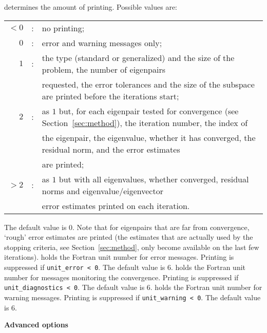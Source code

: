 \begin{description}
%
determines the amount of printing.
Possible values are:\\
%
\begin{tabular}{rcl}
$<0$ &:& no printing;\\
$0$ &:& error and warning messages only;\\
$1$ &:& the type (standard or generalized) and the size of the problem,
the number of eigenpairs \\ 
& & requested, the error tolerances and
the size of the subspace are printed before the iterations start;\\
$2$ &:& as $1$ but, for each eigenpair tested for convergence
(see Section~\ref{sec:method}), the iteration number,
the index of \\
& & 
the eigenpair, the
eigenvalue, whether it has converged, the residual norm, and the error
estimates \\
& & are printed;\\
$>2$ &:& as $1$ but with all eigenvalues, whether converged, residual norms
and eigenvalue/eigenvector\\ 
& & error estimates printed on each iteration. 
\end{tabular}

\noindent
The default value is 0. 
Note that for eigenpairs that are far from convergence,
`rough' error estimates are printed
(the estimates that are actually used by the stopping criteria,
see Section~\ref{sec:method}, only become available on the last few
iterations).
%
holds the Fortran unit number for error messages.
Printing is suppressed if {\tt unit\_error < 0}.
The default value is 6. 
%
holds the Fortran unit number for messages monitoring the convergence.
Printing is suppressed if {\tt unit\_diagnostics < 0}.
The default value is 6. 
%
holds the Fortran unit number for warning messages.
Printing is suppressed if {\tt unit\_warning < 0}.
The default value is 6. 
%
\end{description}

\medskip
\noindent
{\bf Advanced options}

